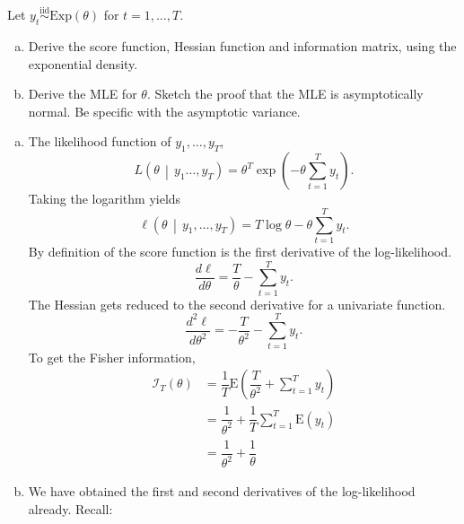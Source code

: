 \documentclass[answers]{exam}
\begin{document}
\begin{questions}
\begin{solution}
  \end{solution}
  \question
  Let $y_{t}\overset{\text{iid}}{\sim}\mathrm{Exp}\left(\theta\right)$ for $t=1,\ldots,T$.
  \begin{enumerate}[a)]
    \item Derive the score function, Hessian function and information matrix, using the exponential density.
    \item Derive the MLE for $\theta$. Sketch the proof that the MLE is asymptotically normal. Be specific with the asymptotic variance.
  \end{enumerate}
  \begin{solution}
    \begin{enumerate}[a)]
      \item The likelihood function of $y_{1},\ldots,y_{T}$,
      \begin{equation}
        L\left(\theta\,\middle|\,y_{1}\ldots,y_{T}\right) = \theta^{T}\exp\left(-\theta\sum_{t=1}^{T}y_{t}\right).
      \end{equation}
      Taking the logarithm yields
      \begin{equation}
        \ell\left(\theta\,\middle|\,y_{1},\ldots,y_{T}\right) = T\log\theta-\theta\sum_{t=1}^{T}y_{t}.
      \end{equation}
      By definition of the score function is the first derivative of the log-likelihood.
      \begin{equation}
        \dfrac{d\ell}{d\theta} = \dfrac{T}{\theta}-\sum_{t=1}^{T}y_{t}.
      \end{equation}
      The Hessian gets reduced to the second derivative for a univariate function.
      \begin{equation}
        \dfrac{d^{2}\ell}{d\theta^{2}} = -\dfrac{T}{\theta^{2}}-\sum_{t=1}^{T}y_{t}.
      \end{equation}
      To get the Fisher information,
      \begin{align}
        \mathcal{I}_{T}\left(\theta\right) &= \dfrac{1}{T}\mathrm{E}\left(\dfrac{T}{\theta^{2}}+\sum_{t=1}^{T}y_{t}\right)\\
        &= \dfrac{1}{\theta^{2}}+\dfrac{1}{T}\sum_{t=1}^{T}\mathrm{E}\left(y_{t}\right)\\
        &= \dfrac{1}{\theta^{2}}+\dfrac{1}{\theta}
      \end{align}
      \item We have obtained the first and second derivatives of the log-likelihood already. Recall:
      \begin{align}

\end{align}
\end{enumerate}
\end{solution}
\end{questions}
\end{document}
